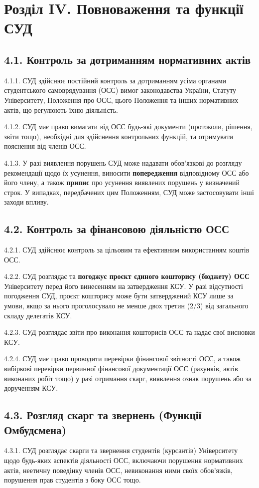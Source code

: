 \section*{Розділ IV. Повноваження та функції СУД}

\subsection*{4.1. Контроль за дотриманням нормативних актів}
    4.1.1. СУД здійснює постійний контроль за дотриманням усіма органами студентського самоврядування (ОСС) вимог законодавства України, Статуту Університету, Положення про ОСС, цього Положення та інших нормативних актів, що регулюють їхню діяльність.

    4.1.2. СУД має право вимагати від ОСС будь-які документи (протоколи, рішення, звіти тощо), необхідні для здійснення контрольних функцій, та отримувати пояснення від членів ОСС.

    4.1.3. У разі виявлення порушень СУД може надавати обов'язкові до розгляду рекомендації щодо їх усунення, виносити \textbf{попередження} відповідному ОСС або його члену, а також \textbf{припис} про усунення виявлених порушень у визначений строк. У випадках, передбачених цим Положенням, СУД може застосовувати інші заходи впливу.

\subsection*{4.2. Контроль за фінансовою діяльністю ОСС}
    4.2.1. СУД здійснює контроль за цільовим та ефективним використанням коштів ОСС.

    4.2.2. СУД розглядає та \textbf{погоджує проєкт єдиного кошторису (бюджету) ОСС} Університету перед його винесенням на затвердження КСУ. У разі відсутності погодження СУД, проєкт кошторису може бути затверджений КСУ лише за умови, якщо за нього проголосувало не менше двох третин (2/3) від загального складу делегатів КСУ.

    4.2.3. СУД розглядає звіти про виконання кошторисів ОСС та надає свої висновки КСУ.

    4.2.4. СУД має право проводити перевірки фінансової звітності ОСС, а також вибіркові перевірки первинної фінансової документації ОСС (рахунків, актів виконаних робіт тощо) у разі отримання скарг, виявлення ознак порушень або за дорученням КСУ.

\subsection*{4.3. Розгляд скарг та звернень (Функції Омбудсмена)}
    4.3.1. СУД розглядає скарги та звернення студентів (курсантів) Університету щодо будь-яких аспектів діяльності ОСС, включаючи порушення нормативних актів, неетичну поведінку членів ОСС, невиконання ними своїх обов'язків, порушення прав студентів з боку ОСС тощо.

